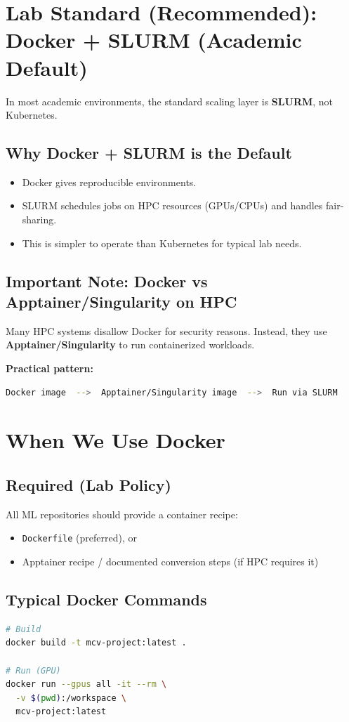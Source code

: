 \documentclass[11pt]{article}
\begin{document}
\section{Lab Standard (Recommended): Docker + SLURM (Academic Default)}
In most academic environments, the standard scaling layer is \textbf{SLURM}, not Kubernetes.

\subsection{Why Docker + SLURM is the Default}
\begin{itemize}
  \item Docker gives reproducible environments.
  \item SLURM schedules jobs on HPC resources (GPUs/CPUs) and handles fair-sharing.
  \item This is simpler to operate than Kubernetes for typical lab needs.
\end{itemize}

\subsection{Important Note: Docker vs Apptainer/Singularity on HPC}
Many HPC systems disallow Docker for security reasons.
Instead, they use \textbf{Apptainer/Singularity} to run containerized workloads.

\textbf{Practical pattern:}
\begin{lstlisting}[language=bash]
Docker image  -->  Apptainer/Singularity image  -->  Run via SLURM
\end{lstlisting}

\section{When We Use Docker}

\subsection{Required (Lab Policy)}
All ML repositories should provide a container recipe:
\begin{itemize}
  \item \texttt{Dockerfile} (preferred), or
  \item Apptainer recipe / documented conversion steps (if HPC requires it)
\end{itemize}

\subsection{Typical Docker Commands}
\begin{lstlisting}[language=bash]
# Build
docker build -t mcv-project:latest .

# Run (GPU)
docker run --gpus all -it --rm \
  -v $(pwd):/workspace \
  mcv-project:latest
\end{lstlisting}
\end{document}
